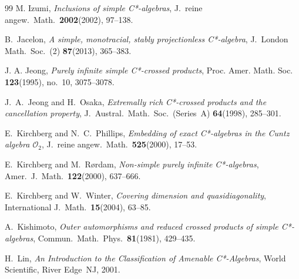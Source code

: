 \documentclass[11pt]{amsart}
\theoremstyle{plain}
\theoremstyle{definition}
\theoremstyle{remark}
\numberwithin{equation}{section}
\begin{document}
\begin{thebibliography}{99}
M. Izumi, \emph{Inclusions of simple C*-algebras},
J.~reine angew.\  Math.\  {\textbf{2002}}(2002), 97--138.

B.~Jacelon,
{\emph{A simple, monotracial, stably projectionless C*-algebra}},
J.~London Math.\  Soc.\  (2) {\textbf{87}}(2013), 365--383.

J. A. Jeong, \emph{Purely infinite simple C*-crossed products}, 
Proc. Amer. Math. Soc. \textbf{123}(1995), no.~10, 3075--3078.


 J.~A.\  Jeong and H.~Osaka,
{\emph{Extremally rich C*-crossed products and the
cancellation property}},
J.~Austral.\  Math.\  Soc.\  (Series~A) {\textbf{64}}(1998), 285--301.



E.~Kirchberg and N.~C.\  Phillips,
{\emph{Embedding of exact C*-algebras in the Cuntz algebra
   ${\mathcal{O}}_2$}},
J.~reine angew.\  Math.\  {\textbf{525}}(2000), 17--53.

E.~Kirchberg and M.~R{\o}rdam,
{\emph{Non-simple purely infinite C*-algebras}},
Amer.\  J.\  Math.\  {\textbf{122}}(2000), 637--666.


E.~Kirchberg and W.~Winter,
{\emph{Covering dimension and quasidiagonality}},
International J.\  Math.\  {\textbf{15}}(2004), 63--85.

A.~Kishimoto,
{\emph{Outer automorphisms and reduced crossed products of simple
  C*-algebras}},
Commun.\  Math.\  Phys.\  {\textbf{81}}(1981), 429--435.



H.~Lin,
{\emph{An Introduction to the Classification of Amenable
C*-Algebras}},
World Scientific, River Edge~NJ, 2001.


\end{thebibliography}
\end{document}
